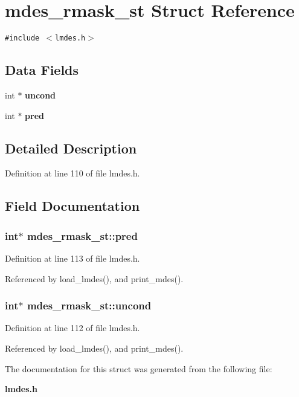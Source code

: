 \section{mdes\_\-rmask\_\-st Struct Reference}
\label{structmdes__rmask__st}
{\tt \#include $<$lmdes.h$>$}

\subsection*{Data Fields}
\begin{CompactItemize}
\item 
int $\ast$ \bf{uncond}
\item 
int $\ast$ \bf{pred}
\end{CompactItemize}


\subsection{Detailed Description}




Definition at line 110 of file lmdes.h.

\subsection{Field Documentation}
\subsubsection{\setlength{\rightskip}{0pt plus 5cm}int$\ast$ \bf{mdes\_\-rmask\_\-st::pred}}\label{structmdes__rmask__st_341998ee97a9ba2f7b60dc8036d9ddd3}




Definition at line 113 of file lmdes.h.

Referenced by load\_\-lmdes(), and print\_\-mdes().
\subsubsection{\setlength{\rightskip}{0pt plus 5cm}int$\ast$ \bf{mdes\_\-rmask\_\-st::uncond}}\label{structmdes__rmask__st_70ba267e31085d18f5d3edda1186d3f3}




Definition at line 112 of file lmdes.h.

Referenced by load\_\-lmdes(), and print\_\-mdes().

The documentation for this struct was generated from the following file:\begin{CompactItemize}
\item 
\bf{lmdes.h}\end{CompactItemize}
